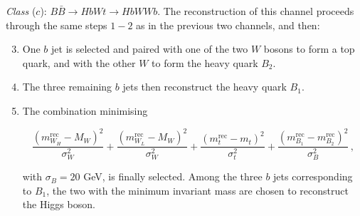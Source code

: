 \documentclass[12pt,a4paper]{article}
\newcommand{\BB}{B \bar B}
\begin{document}
{\em Class} ($c$): $\BB \to Hb Wt \to Hb WWb$. The reconstruction of this channel proceeds through  
the same steps $1-2$ as in the previous two channels, and then:
\begin{enumerate}\setcounter{enumi}{2}
\item One $b$ jet is selected and paired with one of the two $W$ bosons to form a top quark, and with the other $W$ to form the heavy quark $B_2$.
\item The three remaining $b$ jets then reconstruct the heavy quark $B_1$.
\item The combination minimising
\begin{small}
\begin{equation}
\frac{(m_{W_H}^\text{rec}-M_W)^2}{\sigma_W^2} + 
\frac{(m_{W_L}^\text{rec}-M_W)^2}{\sigma_W^2} + 
\frac{(m_{t}^\text{rec}-m_t)^2}{\sigma_t^2} +
\frac{(m_{B_1}^\text{rec}-m_{B_2}^\text{rec})^2}{\sigma_B^2} \,,
\end{equation}
\end{small}%
with $\sigma_B = 20$ GeV,
is finally selected. Among the three $b$ jets corresponding to $B_1$, the two with the minimum invariant mass are chosen to reconstruct the Higgs boson.
\end{enumerate}
\end{document}
